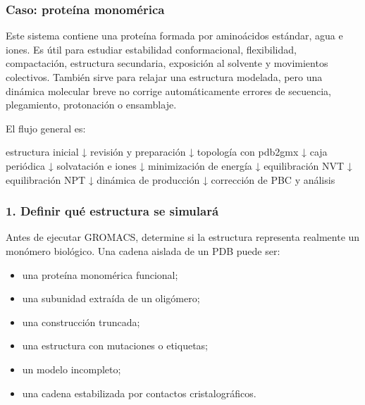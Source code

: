 \documentclass[
  spanish,
  11pt,
  a4paper]{article}
\newenvironment{Shaded}{\begin{snugshade}}{\end{snugshade}}
\newcommand{\NormalTok}[1]{#1}
\providecommand{\tightlist}{%
  \setlength{\itemsep}{0pt}\setlength{\parskip}{0pt}}
\begin{document}
\subsubsection{Caso: proteína
monomérica}\label{caso-proteuxedna-monomuxe9rica}

Este sistema contiene una proteína formada por aminoácidos estándar,
agua e iones. Es útil para estudiar estabilidad conformacional,
flexibilidad, compactación, estructura secundaria, exposición al
solvente y movimientos colectivos. También sirve para relajar una
estructura modelada, pero una dinámica molecular breve no corrige
automáticamente errores de secuencia, plegamiento, protonación o
ensamblaje.

El flujo general es:

\begin{Shaded}
\begin{Highlighting}[]
\NormalTok{estructura inicial}
\NormalTok{    ↓}
\NormalTok{revisión y preparación}
\NormalTok{    ↓}
\NormalTok{topología con pdb2gmx}
\NormalTok{    ↓}
\NormalTok{caja periódica}
\NormalTok{    ↓}
\NormalTok{solvatación e iones}
\NormalTok{    ↓}
\NormalTok{minimización de energía}
\NormalTok{    ↓}
\NormalTok{equilibración NVT}
\NormalTok{    ↓}
\NormalTok{equilibración NPT}
\NormalTok{    ↓}
\NormalTok{dinámica de producción}
\NormalTok{    ↓}
\NormalTok{corrección de PBC y análisis}
\end{Highlighting}
\end{Shaded}

\subsubsection{1. Definir qué estructura se
simulará}\label{definir-quuxe9-estructura-se-simularuxe1}

Antes de ejecutar GROMACS, determine si la estructura representa
realmente un monómero biológico. Una cadena aislada de un PDB puede ser:

\begin{itemize}
\tightlist
\item
  una proteína monomérica funcional;
\item
  una subunidad extraída de un oligómero;
\item
  una construcción truncada;
\item
  una estructura con mutaciones o etiquetas;
\item
  un modelo incompleto;
\item
  una cadena estabilizada por contactos cristalográficos.
\end{itemize}
\end{document}

